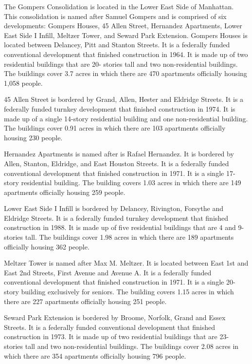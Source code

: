 The Gompers Consolidation is located in the Lower East Side of Manhattan. This consolidation is named after Samuel Gompers and is comprised of six developments: Gompers Houses, 45 Allen Street, Hernandez Apartments, Lower East Side I Infill, Meltzer Tower, and Seward Park Extension. Gompers Houses is located between Delancey, Pitt and Stanton Streets. It is a federally funded conventional development that finished construction in 1964. It is made up of two residential buildings that are 20- stories tall and two non-residential buildings. The buildings cover 3.7 acres in which there are 470 apartments officially housing 1,058 people. \par \vspace{.7\baselineskip}45 Allen Street is bordered by Grand, Allen, Hester and Eldridge Streets. It is a federally funded turnkey development that finished construction in 1974. It is made up of a single 14-story residential building and one non-residential building. The buildings cover 0.91 acres in which there are 103 apartments officially housing 230 people. \par \vspace{.7\baselineskip}Hernandez Apartments is named after is Rafael Hernandez. It is bordered by Allen, Stanton, Eldridge, and East Houston Streets. It is a federally funded conventional development that finished construction in 1971. It is a single 17- story residential building. The building covers 1.03 acres in which there are 149 apartments officially housing 259 people. \par \vspace{.7\baselineskip}Lower East Side I Infill is bordered by Delancey, Rivington, Forsythe and Eldridge Streets. It is a federally funded turnkey development that finished construction in 1988. It is made up of five residential buildings that are 4 and 9- stories tall. The buildings cover 1.98 acres in which there are 189 apartments officially housing 362 people. \par \vspace{.7\baselineskip}Meltzer Tower is named after Max M. Meltzer. It is located between East 1st and East 2nd Streets, First Avenue and Avenue A. It is a federally funded conventional development that finished construction in 1971. It is a single 20-story building exclusively for seniors. The building covers 1.15 acres in which there are 227 apartments officially housing 251 people. \par \vspace{.7\baselineskip}Seward Park Extension is bordered by Broome, Norfolk, Grand and Essex Streets. It is a federally funded conventional development that finished construction in 1973. It is made up of two residential buildings that are 23- stories tall and two non-residential buildings. The buildings cover 2.08 acres in which there are 354 apartments officially housing 796 people.
